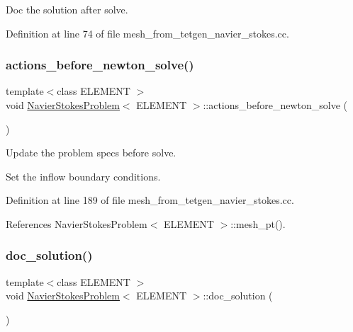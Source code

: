 Doc the solution after solve. 



Definition at line 74 of file mesh\+\_\+from\+\_\+tetgen\+\_\+navier\+\_\+stokes.\+cc.

\mbox{\label{classNavierStokesProblem_a61feda03c9972cae62cfa1c3486bf17a}} 
\subsubsection{\texorpdfstring{actions\+\_\+before\+\_\+newton\+\_\+solve()}{actions\_before\_newton\_solve()}}
{\footnotesize\ttfamily template$<$class E\+L\+E\+M\+E\+NT $>$ \\
void \hyperlink{classNavierStokesProblem}{Navier\+Stokes\+Problem}$<$ E\+L\+E\+M\+E\+NT $>$\+::actions\+\_\+before\+\_\+newton\+\_\+solve (\begin{DoxyParamCaption}{ }\end{DoxyParamCaption})}



Update the problem specs before solve. 

Set the inflow boundary conditions. 

Definition at line 189 of file mesh\+\_\+from\+\_\+tetgen\+\_\+navier\+\_\+stokes.\+cc.



References Navier\+Stokes\+Problem$<$ E\+L\+E\+M\+E\+N\+T $>$\+::mesh\+\_\+pt().

\mbox{\label{classNavierStokesProblem_a220db7388319f4215b54459d32ba784b}} 
\subsubsection{\texorpdfstring{doc\+\_\+solution()}{doc\_solution()}}
{\footnotesize\ttfamily template$<$class E\+L\+E\+M\+E\+NT $>$ \\
void \hyperlink{classNavierStokesProblem}{Navier\+Stokes\+Problem}$<$ E\+L\+E\+M\+E\+NT $>$\+::doc\+\_\+solution (\begin{DoxyParamCaption}{ }\end{DoxyParamCaption})}



